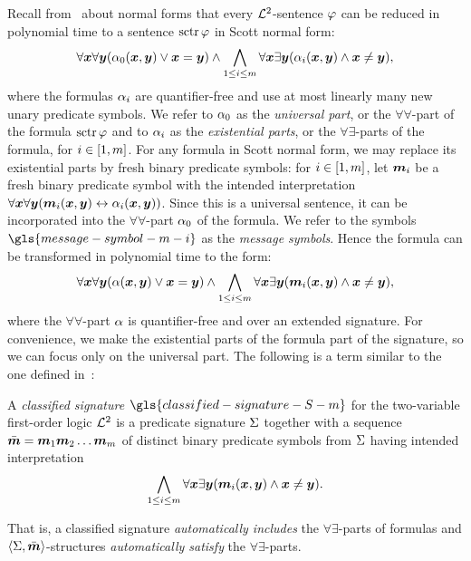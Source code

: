 Recall from~ about normal forms that every $\mathcal{L}^{2}$-sentence
$\varphi$ can be reduced in polynomial time to a sentence $\operatorname{sctr}\varphi$ in Scott
normal form:
\[
  \forall\bm{x}\forall\bm{y} (\alpha_{0}(\bm{x},\bm{y}) \lor \bm{x} = \bm{y}) \land
  \bigwedge_{1 \leq i \leq m} \forall\bm{x}\exists\bm{y}(
  \alpha_{i}(\bm{x},\bm{y}) \land \bm{x} \neq \bm{y}),
\]
where the formulas $\alpha_{i}$ are quantifier-free and use at most linearly many
new unary predicate symbols. We refer to $\alpha_{0}$ as the \emph{universal part},
or the $\forall\forall$-part of the formula $\operatorname{sctr}\varphi$ and to $\alpha_{i}$ as
the \emph{existential parts}, or the $\forall\exists$-parts of the formula,
for $i \in [1,m]$.
For any formula in Scott normal form, we may replace its existential parts
by fresh binary predicate symbols: for $i \in [1,m]$, let $\bm{m}_{i}$ be a
fresh binary predicate symbol with the intended interpretation
$\forall\bm{x}\forall\bm{y} (\bm{m}_{i}(\bm{x},\bm{y}) \leftrightarrow \alpha_{i}(\bm{x},\bm{y}))$.
Since this is a universal sentence, it can be incorporated into the
$\forall\forall$-part $\alpha_{0}$ of the formula.
We refer to the symbols $\gls{message-symbol-m-i}$ as the \emph{message
symbols}.
Hence the formula can be transformed in polynomial time to the form:
\begin{equation}\label{eq:twovar-msg-nf}
  \forall\bm{x}\forall\bm{y} (\alpha(\bm{x},\bm{y}) \lor \bm{x} = \bm{y}) \land
  \bigwedge_{1 \leq i \leq m} \forall\bm{x}\exists\bm{y}
  (\bm{m}_{i}(\bm{x},\bm{y}) \land \bm{x} \neq \bm{y}),
\end{equation}
where the $\forall\forall$-part $\alpha$ is quantifier-free and over an extended
signature. For convenience, we make the existential parts of the formula part of
the signature, so we can focus only on the universal part. The following is a
term similar to the one defined in~\cite{MALQ:MALQ201400102}:
\begin{definition}
A \emph{classified signature} $\gls{classified-signature-S-m}$ for the
two-variable first-order logic $\mathcal{L}^{2}$ is a predicate signature $\mathrm{\Sigma}$ together
with a sequence $\sms = \smm1\smm2\dots\smm\nm$ of distinct binary predicate
symbols from $\mathrm{\Sigma}$ having intended interpretation
\begin{equation}\label{eq:twovar-ms-iinter}
  \bigwedge_{1 \leq i \leq m} \forall\bm{x}\exists\bm{y} 
  (\bm{m}_{i}(\bm{x},\bm{y}) \land \bm{x} \neq \bm{y}).
\end{equation}
\end{definition}
That is, a classified signature \emph{automatically includes} the
$\forall\exists$-parts of formulas and $\left\langle \mathrm{\Sigma},\bar{\bm{m}} \right\rangle$-structures
\emph{automatically satisfy} the $\forall\exists$-parts.

